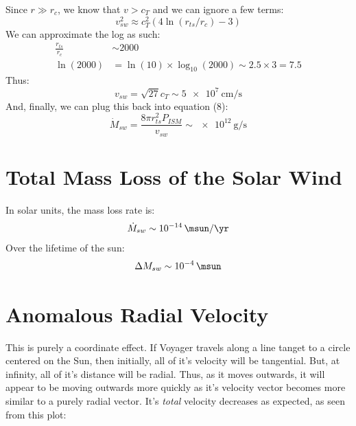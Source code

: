\documentclass{article}
\begin{document}
			Since $r\gg r_{c}$, we know that $v>c_{T}$ and we can ignore a few terms:
			\begin{equation}
				v_{sw}^{2} \approx c_{T}^{2}(4\ln(r_{ts}/r_{c})-3)
			\end{equation}
			We can approximate the log as such:
			\begin{align}
				\frac{r_{ts}}{r_{c}} &\sim 2000\\
				\ln(2000) &= \ln(10)\times\log_{10}(2000)\sim 2.5\times3= 7.5
			\end{align}
			Thus:
			\begin{equation}
				v_{sw} = \sqrt{27}c_{T} \sim \SI{5e7}{\cm\per\second} 
			\end{equation}
			And, finally, we can plug this back into equation (8):
			\begin{equation}
				\dot{M}_{sw} = \frac{8\pi r_{ts}^{2}P_{ISM}}{v_{sw}} \sim \SI{e12}{\gram\per\second}
			\end{equation}
			
	
	\section{Total Mass Loss of the Solar Wind}
		
		In solar units, the mass loss rate is:
		\begin{equation}
			\dot{M}_{sw} \sim \SI{e-14}{\msun\per\yr}
		\end{equation}
		Over the lifetime of the sun:
		\begin{equation}
			\Delta M_{sw} \sim \SI{e-4}{\msun}
		\end{equation}
	
	\section{Anomalous Radial Velocity}
		
		This is purely a coordinate effect.  If Voyager travels along a line tanget to a circle centered on the Sun, then initially, all of it's velocity will be tangential.  But, at infinity, all of it's distance will be radial.   Thus, as it moves outwards, it will appear to be moving outwards more quickly as it's velocity vector becomes more similar to a purely radial vector.  It's \emph{total} velocity decreases as expected, as seen from this plot:
		
\end{document}
